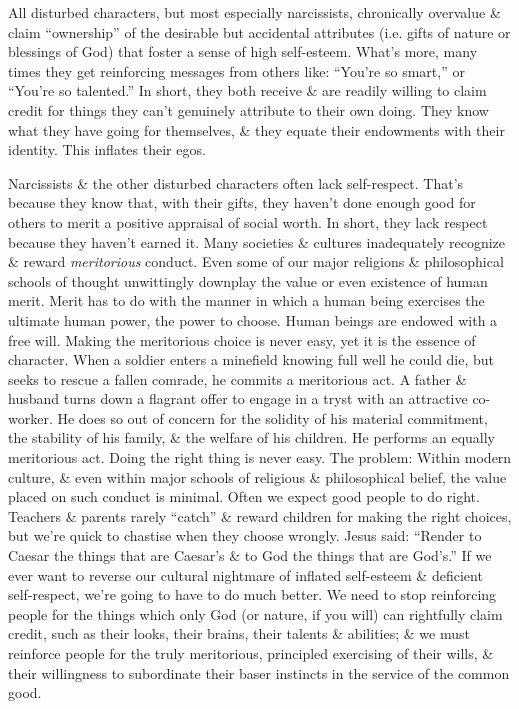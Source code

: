 \documentclass{article}
\numberwithin{equation}{section}
\begin{document}
\begin{itemize}
	All disturbed characters, but most especially narcissists, chronically overvalue \& claim ``ownership'' of the desirable but accidental attributes (i.e. gifts of nature or blessings of God) that foster a sense of high self-esteem. What's more, many times they get reinforcing messages from others like: ``You're so smart,'' or ``You're so talented.'' In short, they both receive \& are readily willing to claim credit for things they can't genuinely attribute to their own doing. They know what they have going for themselves, \& they equate their endowments with their identity. This inflates their egos.
	
	Narcissists \& the other disturbed characters often lack self-respect. That's because they know that, with their gifts, they haven't done enough good for others to merit a positive appraisal of social worth. In short, they lack respect because they haven't earned it. Many societies \& cultures inadequately recognize \& reward \textit{meritorious} conduct. Even some of our major religions \& philosophical schools of thought unwittingly downplay the value or even existence of human merit. Merit has to do with the manner in which a human being exercises the ultimate human power, the power to choose. Human beings are endowed with a free will. Making the meritorious choice is never easy, yet it is the essence of character. When a soldier enters a minefield knowing full well he could die, but seeks to rescue a fallen comrade, he commits a meritorious act. A father \& husband turns down a flagrant offer to engage in a tryst with an attractive co-worker. He does so out of concern for the solidity of his material commitment, the stability of his family, \& the welfare of his children. He performs an equally meritorious act. Doing the right thing is never easy. The problem: Within modern culture, \& even within major schools of religious \& philosophical belief, the value placed on such conduct is minimal. Often we expect good people to do right. Teachers \& parents rarely ``catch'' \& reward children for making the right choices, but we're quick to chastise when they choose wrongly. Jesus said: ``Render to Caesar the things that are Caesar's \& to God the things that are God's.'' If we ever want to reverse our cultural nightmare of inflated self-esteem \& deficient self-respect, we're going to have to do much better. We need to stop reinforcing people for the things which only God (or nature, if you will) can rightfully claim credit, such as their looks, their brains, their talents \& abilities; \& we must reinforce people for the truly meritorious, principled exercising of their wills, \& their willingness to subordinate their baser instincts in the service of the common good.
	

\end{itemize}
\end{document}
